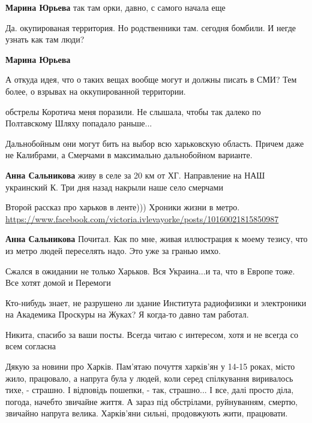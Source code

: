 \begin{itemize}
\begin{itemize} %
\textbf{Марина Юрьева} так там орки, давно, с самого начала еще


Да. окупированая территория. Но родственники там. сегодня бомбили. И негде узнать как там люди?

\textbf{Марина Юрьева} 

А откуда идея, что о таких вещах вообще могут и должны писать в СМИ? Тем более,
о взрывах на оккупированной территории.

\end{itemize} %

обстрелы Коротича меня поразили. Не слышала, чтобы так далеко по Полтавскому Шляху попадало раньше...

\begin{itemize} %

Дальнобойным они могут бить на выбор всю харьковскую область. Причем даже не
Калибрами, а Смерчами в максимально дальнобойном варианте.

\textbf{Анна Сальникова} живу в селе за 20 км от ХГ. Направление на НАШ украинский К. Три дня назад накрыли наше село смерчами
\end{itemize} %


Второй рассказ про харьков в ленте))) Хроники жизни в метро.
\url{https://www.facebook.com/victoria.ivlevayorke/posts/10160021815850987}

\textbf{Анна Сальникова} Почитал. Как по мне, живая иллюстрация к моему тезису, что из метро людей переселять надо. Это уже за гранью имхо.

Сжался в ожидании не только Харьков. Вся Украина...и та, что в Европе тоже. Все хотят домой и Перемоги


Кто-нибудь знает, не разрушено ли здание Института радиофизики и электроники на
Академика Проскуры на Жуках? Я когда-то давно там работал.

Никита, спасибо за ваши посты. Всегда читаю с интересом, хотя и не всегда со всем согласна


Дякую за новини про Харків. Пам'ятаю почуття харків'ян у 14-15 роках, місто
жило, працювало, а напруга була у людей, коли серед спілкування виривалось
тихе, - страшно. І відповідь пошепки, - так, страшно... І все, далі просто
діла, погода, начебто звичайне життя. А зараз під обстрілами, руйнуванням,
смертю, звичайно напруга велика. Харків'яни сильні, продовжують жити,
працювати.


\end{itemize}
